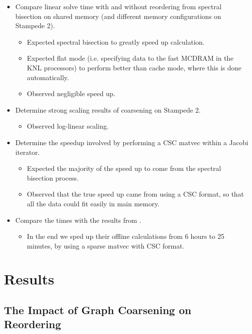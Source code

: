 \documentclass[11pt]{article}
\begin{document}
\begin{itemize}
	\item Compare linear solve time with and without reordering from
spectral bisection on shared memory (and different memory
		configurations on Stampede 2). 
		\begin{itemize}
			\item Expected spectral bisection to greatly speed up
				calculation. 
                        \item Expected flat mode (i.e. specifying data to the
fast MCDRAM in the KNL processors) to perform better than cache mode, where this
is done automatically.
			\item Observed negligible speed up.
		\end{itemize}
	
	\item Determine strong scaling results of coarsening on Stampede 2. 
		\begin{itemize}
			\item Observed log-linear scaling. 
		\end{itemize}
	\item Determine the speedup involved by performing a CSC matvec within a
		Jacobi iterator. 
		\begin{itemize}
			\item Expected the majority of the speed up to come from
				the spectral bisection process. 
			\item Observed that the true speed up came from using a
				CSC format, so that all the data could fit
				easily in main memory. 
		\end{itemize}
	\item Compare the times with the results from \cite{xie}.
		\begin{itemize}
			\item In the end we sped up their offline calculations
				from 6 hours to 25 minutes, by using a sparse
				matvec with CSC format. 
		\end{itemize}
\end{itemize}

\section{Results}
\subsection{The Impact of Graph Coarsening on Reordering}
\end{document}
